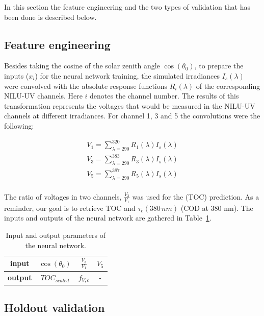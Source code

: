\documentclass{optica-article}
\begin{document}
In this section the feature engineering and the two types of validation that has been done is described below.

\subsection{Feature engineering}

Besides taking the cosine of the solar zenith angle $\cos(\theta_0)$, to prepare the inputs ($x_i$) for the neural network training, the simulated irradiances $I_s(\lambda)$  were convolved with the absolute response functions $R_i(\lambda)$ of the corresponding NILU-UV channels.
Here $i$ denotes the channel number. 
The results of this transformation represents the voltages that would be measured in the NILU-UV channels at different irradiances.   
For channel 1, 3 and 5 the convolutions were the following:

\begin{equation}
	\begin{split}
		V_1 = \sum_{\lambda = 290}^{320}R_1(\lambda)I_s(\lambda) \\
		V_3 = \sum_{\lambda = 290}^{383}R_3(\lambda)I_s(\lambda) \\
		V_5 = \sum_{\lambda = 290}^{387}R_5(\lambda)I_s(\lambda) \\
	\end{split}
\end{equation}

The ratio of voltages in two channels, $\frac{V_3}{V_1}$  was used for the (TOC) prediction. 
As a reminder, our goal is to retrieve TOC and $\tau_c{\scriptstyle(380 \, nm)}$ (COD at 380 nm). 
The inputs and outputs of the neural network are gathered in {Table~\ref{tab:nn_inputs}}.

\begin{table}[H]	
	\centering
	\begin{tabular}{c|c|c|c}
		\textbf{input} & $\cos(\theta_0)$ &  $\frac{V_3}{V_1}$ & $V_5$ \\
		\hline
		\textbf{output} & $TOC_{scaled}$ & $f_{V,c}$ & - \\
	\end{tabular}
	\caption{Input and output parameters of the neural network.}
	\label{tab:nn_inputs}
\end{table}


\subsection{Holdout validation}
\end{document}

